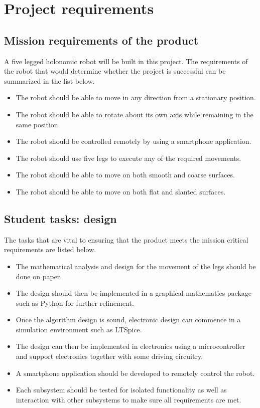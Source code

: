 
\section{Project requirements}


\subsection{Mission requirements of the product}A five legged holonomic robot will be built in this project. The requirements of the robot that would determine whether the project is successful can be summarized in the list below.
\begin{itemize}
\item The robot should be able to move in any direction from a stationary position.
\item The robot should be able to rotate about its own axis while remaining in the same position.
\item The robot should be controlled remotely by using a smartphone application.
\item The robot should use five legs to execute any of the required movements.
\item The robot should be able to move on both smooth and coarse surfaces.
\item The robot should be able to move on both flat and slanted surfaces.
\end{itemize}

\subsection{Student tasks: design}
The tasks that are vital to ensuring that the product meets the mission critical requirements are listed below.
\begin{itemize}
\item The mathematical analysis and design for the movement of the legs should be done on paper.
\item The design should then be implemented in a graphical mathematics package such as Python for further refinement.
\item Once the algorithm design is sound, electronic design can commence in a simulation environment such as LTSpice.
\item The design can then be implemented in electronics using a microcontroller and support electronics together with some driving circuitry.
\item A smartphone application should be developed to remotely control the robot.
\item Each subsystem should be tested for isolated functionality as well as interaction with other subsystems to make sure all requirements are met. 
\end{itemize}

